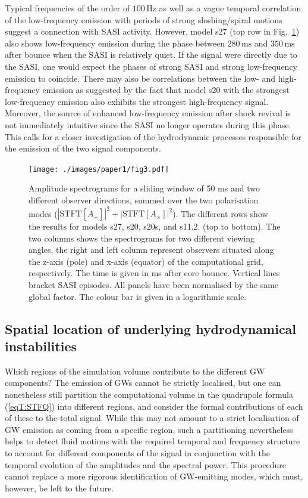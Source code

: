 Typical frequencies of the order of $100 \, \mathrm{Hz}$ as well as a
vague temporal correlation of the low-frequency emission with periods
of strong sloshing/spiral motions suggest a connection with
SASI activity. However, model s27 (top row in
Fig.~\ref{fig:spectrograms}) also shows low-frequency emission during
the phase between $280 \, \mathrm{ms}$ and $350 \, \mathrm{ms}$ after
bounce when the SASI is relatively quiet. If the signal were
directly due to the SASI, one would expect the phases of strong SASI
and strong low-frequency emission to coincide. There may also be
correlations between the low- and high-frequency emission as suggested
by the fact that model s20 with the strongest
low-frequency emission also exhibits the strongest high-frequency
signal. Moreover, the source of enhanced low-frequency emission after
shock revival is not immediately intuitive since the SASI no longer
operates during this phase.  This calls for a closer investigation of
the hydrodynamic processes responsible for the emission of the two
signal components.

\begin{figure}
\centering                                                                             
\texttt{[image: ./images/paper1/fig3.pdf]} \\
\caption{Amplitude spectrograms for a sliding window of 50 ms and two different observer
  directions, summed over the two polarisation modes 
  ($|\text{STFT}[{A_+}]|^2 + |\text{STFT}[{A_{\times}}]|^2$). The
  different rows show the results for models s27, s20, s20s, and s11.2. (top to bottom).
  The two columns shows the spectrograms for two different viewing angles, the right and left column represent
  observers situated along the z-axis (pole) and x-axis (equator) of the computational grid, respectively.
  The time is given in ms after core bounce. Vertical lines bracket SASI episodes. All panels have been normalised by the same global factor.
  The colour bar is given in a logarithmic scale.
\label{fig:spectrograms}}
\end{figure}

\subsection{Spatial location of underlying hydrodynamical instabilities} \label{sec:spaceloc}
Which regions of the simulation volume contribute to the different GW
components? The emission of GWs cannot be strictly
localised, but one can nonetheless still partition the computational volume 
in the quadrupole formula (\ref{eqT:STFQ}) into different regions,
and consider the formal contributions of each of these to the total
signal. While this may not amount to a strict localisation
of GW emission as coming from  a specific region, such a partitioning
nevertheless helps to detect fluid motions with the required
temporal and frequency structure to account for different components
of the signal {in conjunction with the temporal
evolution of the amplitudes and the spectral power. This procedure
cannot replace a more rigorous identification of GW-emitting modes,
which must, however, be left to the future.}

